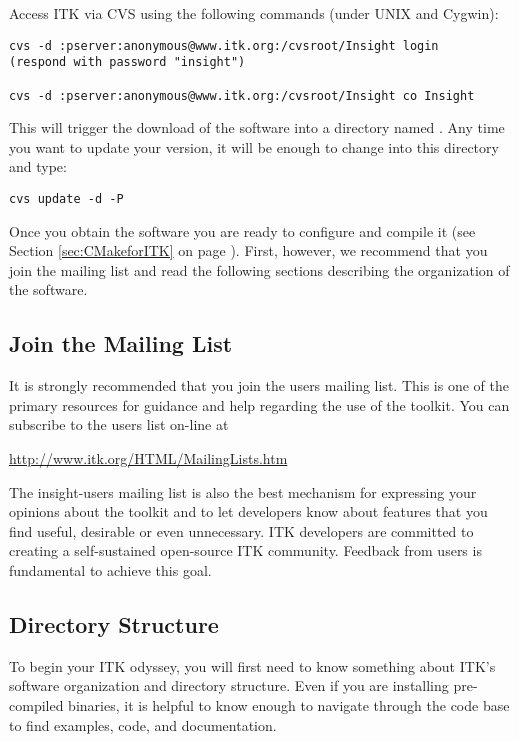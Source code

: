 Access ITK via CVS using the following commands (under UNIX and Cygwin): 
\begin{verbatim}
cvs -d :pserver:anonymous@www.itk.org:/cvsroot/Insight login
(respond with password "insight")

cvs -d :pserver:anonymous@www.itk.org:/cvsroot/Insight co Insight
\end{verbatim}

This will trigger the download of the software into a directory named
.  Any time you want to update your version, it will be enough to
change into this directory  and type:
\begin{verbatim}
cvs update -d -P
\end{verbatim}

Once you obtain the software you are ready to configure and compile it (see
Section \ref{sec:CMakeforITK} on page \pageref{sec:CMakeforITK}). First,
however, we recommend that you join the mailing list and read the following
sections describing the organization of the software. 

\subsection{Join the Mailing List}
\label{sec:JoinMailList}


It is strongly recommended that you join the users mailing list. This is one
of the primary resources for guidance and help regarding the use of the 
toolkit. You can subscribe to the users list on-line at

\begin{center}
\url{http://www.itk.org/HTML/MailingLists.htm}
\end{center} 

The insight-users mailing list is also the best mechanism for expressing your
opinions about the toolkit and to let developers know about features that you
find useful, desirable or even unnecessary. ITK developers are committed to
creating a self-sustained open-source ITK community. Feedback from users is
fundamental to achieve this goal.

\subsection{Directory Structure}
\label{sec:DirectoryStructure}

To begin your ITK odyssey, you will first need to know something about ITK's
software organization and directory structure. Even if you are installing
pre-compiled binaries, it is helpful to know enough to navigate through the
code base to find examples, code, and documentation.

